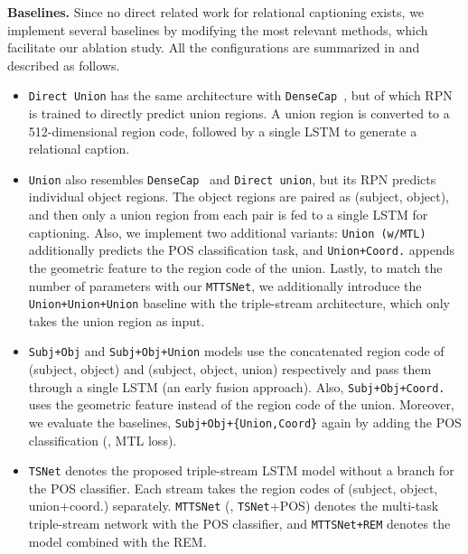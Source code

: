 \noindent\textbf{Baselines.} Since no direct {related} work for relational captioning exists, we implement several baselines by modifying the most relevant methods, which facilitate our ablation study.
All the configurations are summarized in  and described as follows.




{\setdefaultleftmargin{3mm}{}{}{}{}{}
\begin{itemize}
\item \texttt{Direct Union} has the same architecture with \texttt{DenseCap}~\cite{johnson2016densecap}, but of which RPN is trained to directly predict union regions.
{A union region is converted to a {512-dimensional} region code, followed by a single LSTM to generate a relational caption.}\vspace{0mm}

\item \texttt{Union} also resembles \texttt{DenseCap}~\cite{johnson2016densecap} and \texttt{Direct union}, but its RPN predicts individual object regions. 
The object regions are paired as (subject, object), and then {only} a union region from each pair is fed to a single LSTM for captioning.
Also, we implement two additional variants: \texttt{Union (w/MTL)} additionally predicts the POS classification task, and 
\texttt{Union+Coord.} appends the geometric feature to the region code of the union.
{Lastly, to match the number of parameters with our \texttt{MTTSNet}, we additionally introduce the \texttt{Union+Union+Union} baseline with the triple-stream architecture, which only takes the union region as input.}
\vspace{0mm}

\item \texttt{Subj+Obj} and \texttt{Subj+Obj+Union} models use the concatenated region code of (subject, object) and (subject, object, union) respectively and pass them through a single LSTM (an early fusion approach).
Also, \texttt{Subj+Obj+Coord.} uses the geometric feature instead of the region code of the union.
Moreover, we {evaluate the baselines}, \texttt{Subj+Obj+\{Union,Coord\}} {again by adding} the POS classification (\ie, MTL loss).
\vspace{0mm}

\item \texttt{TSNet} denotes the proposed triple-stream LSTM model without a branch for the POS classifier.
Each stream takes the region codes of (subject, object, union{+}coord.) separately. 
\texttt{MTTSNet} (\ie, \texttt{TSNet}{+}POS) denotes the {multi-task triple-stream network with the POS classifier, and} \texttt{MTTSNet+REM}  denotes the model {combined with} the REM.


\end{itemize}
}
 


